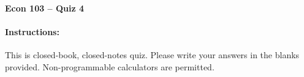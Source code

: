 \documentclass[addpoints,10pt]{exam}
\begin{document}
\thispagestyle{empty}

\noindent \textbf{Econ 103 -- Quiz 4}

\vspace{15pt}
\noindent
{}\hfill 

\paragraph{Instructions: } This is closed-book, closed-notes quiz. Please write your answers in the blanks provided. Non-programmable calculators are permitted.

\vspace{5pt}

\setlength\answerlinelength{6in}

\vspace{0.2in}
\end{document}
